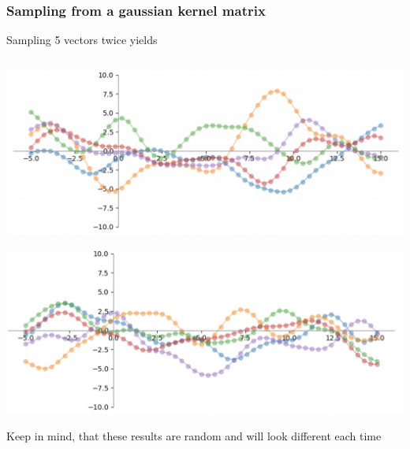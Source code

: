 \documentclass[10pt,aspectratio=169,handout]{beamer}
\begin{document}
\begin{frame}
    \frametitle{Sampling from a gaussian kernel matrix}

    Sampling 5 vectors twice yields

    \inputminted[bgcolor=LightGray,fontsize=\small]{python}{code/gaussian_sampling.py}

    \begin{minipage}{0.49\textwidth}
        \includegraphics[width=\textwidth]{images/ex3.3.2a.png}
    \end{minipage}
    \begin{minipage}{0.49\textwidth}
        \includegraphics[width=\textwidth]{images/ex3.3.2b.png}
    \end{minipage}

    Keep in mind, that these results are random and will look different each time

\end{frame}
\end{document}

